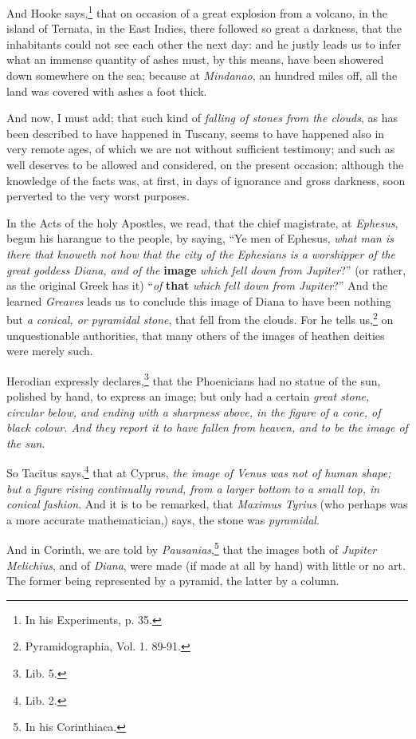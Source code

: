 \documentclass[a4paper, 12pt, oneside]{article}
\begin{document}
And Hooke says,\footnote{In his Experiments, p. 35.} that on occasion of a great explosion from a volcano, in the island of Ternata, in the East Indies, there followed so great a darkness, that the inhabitants could not see each other the next day: and he justly leads us to infer what an immense quantity of ashes must, by this means, have been showered down somewhere on the sea; because at \emph{Mindanao}, an hundred miles off, all the land was covered with ashes a foot thick.

And now, I must add; that such kind of \emph{falling of stones from the clouds}, as has been described to have happened in Tuscany, seems to have happened also in very remote ages, of which we are not without sufficient testimony; and such as well deserves to be allowed and considered, on the present occasion; although the knowledge of the facts was, at first, in days of ignorance and gross darkness, soon perverted to the very worst purposes.

In the Acts of the holy Apostles, we read, that the chief magistrate, at \emph{Ephesus}, begun his harangue to the people, by saying, ``Ye men of Ephesus, \emph{what man is there that knoweth not how that the city of the Ephesians is a worshipper of the great goddess Diana, and of the} \textbf{image} \emph{which fell down from Jupiter}?'' (or rather, as the original Greek has it) ``\emph{of} \textbf{that} \emph{which fell down from Jupiter}?'' And the learned \emph{Greaves} leads us to conclude this image of Diana to have been nothing but \emph{a conical, or pyramidal stone}, that fell from the clouds. For he tells us,\footnote{Pyramidographia, Vol. 1. 89-91.} on unquestionable authorities, that many others of the images of heathen deities were merely such.

Herodian expressly declares,\footnote{Lib. 5.} that the Phoenicians had no statue of the sun, polished by hand, to express an image; but only had a certain \emph{great stone, circular below, and ending with a sharpness above, in the figure of a cone, of black colour. And they report it to have fallen from heaven, and to be the image of the sun}.

So Tacitus says,\footnote{Lib. 2.} that at Cyprus, \emph{the image of Venus was not of human shape; but a figure rising continually round, from a larger bottom to a small top, in conical fashion}. And it is to be remarked, that \emph{Maximus Tyrius} (who perhaps was a more accurate mathematician,) says, the stone was \emph{pyramidal}.

And in Corinth, we are told by \emph{Pausanias},\footnote{In his Corinthiaca.} that the images both of \emph{Jupiter Melichius}, and of \emph{Diana}, were made (if made at all by hand) with little or no art. The former being represented by a pyramid, the latter by a column.
\end{document}
